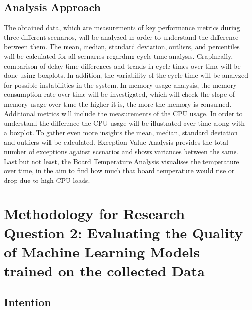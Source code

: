 \documentclass[Master,BMR,english]{twbook}
\begin{document}
\subsection{Analysis Approach}

The obtained data, which are measurements of key performance metrics during three different scenarios, will be analyzed in order to understand the difference between them. The mean, median, standard deviation, outliers, and percentiles will be calculated for all scenarios regarding cycle time analysis. Graphically, comparison of delay time differences and trends in cycle times over time will be done using boxplots. In addition, the variability of the cycle time will be analyzed for possible instabilities in the system. In memory usage analysis, the memory consumption rate over time will be investigated, which will check the slope of memory usage over time the higher it is, the more the memory is consumed. Additional metrics will include the measurements of the CPU usage. In order to understand the difference the CPU usage will be illustrated over time along with a boxplot. To gather even more insights the mean, median, standard deviation and outliers will be calculated. Exception Value Analysis provides the total number of exceptions against scenarios and shows variances between the same. Last but not least, the Board Temperature Analysis visualises the temperature over time, in the aim to find how much that board temperature would rise or drop due to high CPU loads.


\section{Methodology for Research Question 2: Evaluating the Quality of Machine Learning Models trained on the collected Data}


\subsection{Intention}
\end{document}
